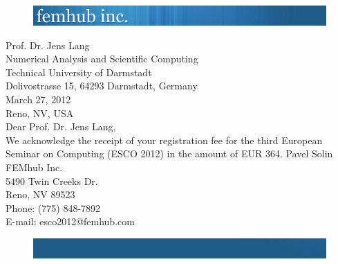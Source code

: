\documentclass{article}
\begin{document}
\vbox{}
\vspace{-2cm}
\begin{figure}[!ht]
\includegraphics[width=\textwidth]{../femhub_logo.png}
\vspace{1cm}
\end{figure}
\noindent
Prof. Dr. Jens Lang\\
Numerical Analysis and Scientific Computing\\
Technical University of Darmstadt\\
Dolivostrasse 15, 64293 Darmstadt, Germany\\

\noindent
\hbox{} \hfill March 27, 2012\\
\hbox{} \hfill Reno, NV, USA\\
Dear Prof. Dr. Jens Lang,\\
\newline
\noindent
We acknowledge the receipt of your registration fee for the 
third European Seminar on Computing (ESCO 2012) in 
the amount of EUR 364.
\newline
\vspace{1cm}
\newline
\hbox{}
\hspace{-4mm}
\vspace{2cm}
\newline
\noindent
Pavel Solin\\
FEMhub Inc.\\
5490 Twin Creeks Dr.\\
Reno, NV 89523\\
Phone: (775) 848-7892\\
E-mail: esco2012@femhub.com
\begin{figure}[!ht]
\includegraphics[width=\textwidth]{../femhub_footer.png}
\vspace{1cm}
\end{figure}
\end{document}
